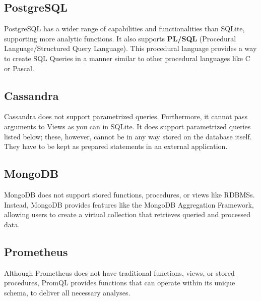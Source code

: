 \subsection{PostgreSQL}
\par PostgreSQL has a wider range of capabilities and functionalities than SQLite, supporting more analytic functions. It also supports \textbf{PL/SQL} (Procedural Language/Structured Query Language). This procedural language provides a way to create SQL Queries in a manner similar to other procedural languages like C or Pascal. 


\subsection{Cassandra}
\par Cassandra does not support parametrized queries. Furthermore, it cannot pass arguments to Views as you can in SQLite. It does support parametrized queries listed below; these, however, cannot be in any way stored on the database itself. They have to be kept as prepared statements in an external application.

\subsection{MongoDB}
\par MongoDB does not support stored functions, procedures, or views like RDBMSs. Instead, MongoDB provides features like the MongoDB Aggregation Framework, allowing users to create a virtual collection that retrieves queried and processed data. 

\subsection{Prometheus}
\par Although Prometheus does not have traditional functions, views, or stored procedures, PromQL provides functions that can operate within its unique schema, to deliver all necessary analyses. 

